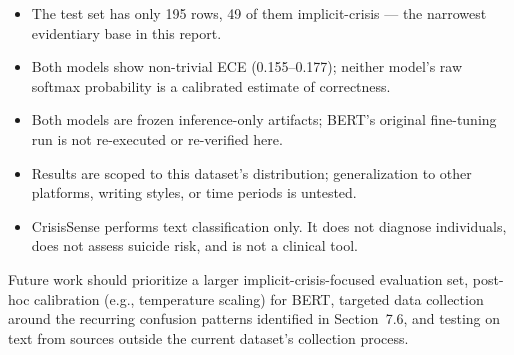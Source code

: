 \documentclass[12pt,a4paper]{article}
\begin{document}
\begin{itemize}[nosep]
  \item The test set has only 195 rows, 49 of them implicit-crisis --- the narrowest evidentiary base in this report.
  \item Both models show non-trivial ECE (0.155--0.177); neither model's raw softmax probability is a calibrated estimate of correctness.
  \item Both models are frozen inference-only artifacts; BERT's original fine-tuning run is not re-executed or re-verified here.
  \item Results are scoped to this dataset's distribution; generalization to other platforms, writing styles, or time periods is untested.
  \item CrisisSense performs text classification only. It does not diagnose individuals, does not assess suicide risk, and is not a clinical tool.
\end{itemize}

Future work should prioritize a larger implicit-crisis-focused evaluation set, post-hoc calibration (e.g., temperature scaling) for BERT, targeted data collection around the recurring confusion patterns identified in Section~7.6, and testing on text from sources outside the current dataset's collection process.



\end{document}
